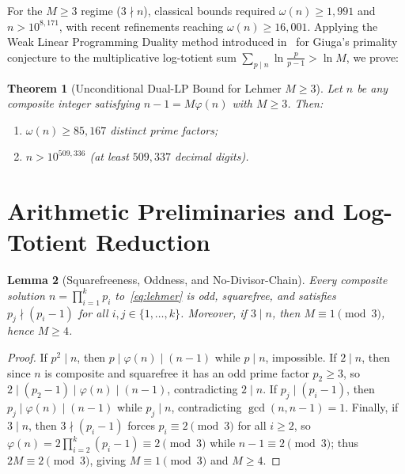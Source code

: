 \documentclass[11pt]{amsart}
\newtheorem{theorem}{Theorem}[section]
\newtheorem{lemma}[theorem]{Lemma}
\theoremstyle{remark}
\numberwithin{equation}{section}
\begin{document}
For the $M \ge 3$ regime ($3 \nmid n$), classical bounds required $\omega(n) \ge 1{,}991$ and $n > 10^{8{,}171}$, with recent refinements reaching $\omega(n) \ge 16{,}001$. Applying the Weak Linear Programming Duality method introduced in~\cite{BarmaseNeon2026} for Giuga's primality conjecture to the multiplicative log-totient sum $\sum_{p \mid n} \ln\frac{p}{p-1} > \ln M$, we prove:

\begin{theorem}[Unconditional Dual-LP Bound for Lehmer $M \ge 3$]\label{thm:main}
Let $n$ be any composite integer satisfying $n - 1 = M\varphi(n)$ with $M \ge 3$. Then:
\begin{enumerate}
    \item $\omega(n) \ge 85{,}167$ distinct prime factors;
    \item $n > 10^{509{,}336}$ (at least $509{,}337$ decimal digits).
\end{enumerate}
\end{theorem}

\section{Arithmetic Preliminaries and Log-Totient Reduction}

\begin{lemma}[Squarefreeness, Oddness, and No-Divisor-Chain]\label{lem:basic}
Every composite solution $n = \prod_{i=1}^k p_i$ to~\eqref{eq:lehmer} is odd, squarefree, and satisfies $p_j \nmid (p_i - 1)$ for all $i, j \in \{1,\dots,k\}$. Moreover, if $3 \mid n$, then $M \equiv 1 \pmod 3$, hence $M \ge 4$.
\end{lemma}

\begin{proof}
If $p^2 \mid n$, then $p \mid \varphi(n) \mid (n - 1)$ while $p \mid n$, impossible. If $2 \mid n$, then since $n$ is composite and squarefree it has an odd prime factor $p_2 \ge 3$, so $2 \mid (p_2 - 1) \mid \varphi(n) \mid (n - 1)$, contradicting $2 \mid n$. If $p_j \mid (p_i - 1)$, then $p_j \mid \varphi(n) \mid (n - 1)$ while $p_j \mid n$, contradicting $\gcd(n, n-1) = 1$. Finally, if $3 \mid n$, then $3 \nmid (p_i - 1)$ forces $p_i \equiv 2 \pmod 3$ for all $i \ge 2$, so $\varphi(n) = 2\prod_{i=2}^k (p_i - 1) \equiv 2 \pmod 3$ while $n - 1 \equiv 2 \pmod 3$; thus $2M \equiv 2 \pmod 3$, giving $M \equiv 1 \pmod 3$ and $M \ge 4$.
\end{proof}
\end{document}

